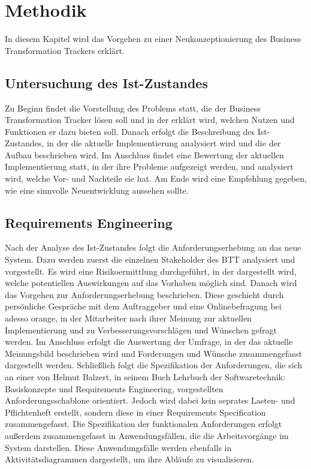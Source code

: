 \section{Methodik}
In diesem Kapitel wird das Vorgehen zu einer Neukonzeptionierung des Business Transformation Trackers erklärt.

\subsection{Untersuchung des Ist-Zustandes}
Zu Beginn findet die Vorstellung des Problems statt, die der Business Transformation Tracker lösen soll und in der erklärt wird, welchen Nutzen und Funktionen er dazu bieten soll. Danach erfolgt die Beschreibung des Ist-Zustandes, in der die aktuelle Implementierung analysiert wird und die der Aufbau beschrieben wird. Im Anschluss findet eine Bewertung der aktuellen Implementierung statt, in der ihre Probleme aufgezeigt werden, und analysiert wird, welche Vor- und Nachteile sie hat. Am Ende wird eine Empfehlung gegeben, wie eine sinnvolle Neuentwicklung aussehen sollte.

\subsection{Requirements Engineering}
Nach der Analyse des Ist-Zustandes folgt die Anforderungserhebung an das neue System. Dazu werden zuerst die einzelnen Stakeholder des BTT analysiert und vorgestellt. Es wird eine Risikoermittlung durchgeführt, in der dargestellt wird, welche potentiellen Auswirkungen auf das Vorhaben möglich sind. Danach wird das Vorgehen zur Anforderungserhebung beschrieben. Diese geschieht durch persönliche Gespräche mit dem Auftraggeber und eine Onlinebefragung bei adesso orange, in der Mitarbeiter nach ihrer Meinung zur aktuellen Implementierung und zu Verbesserungsvorschlägen und Wünschen gefragt werden. Im Anschluss erfolgt die Auswertung der Umfrage, in der das aktuelle Meinungsbild beschrieben wird und Forderungen und Wünsche zusammengefasst dargestellt werden. Schließlich folgt die Spezifikation der Anforderungen, die sich an einer von Helmut Balzert, in seinem Buch \glqq{}Lehrbuch der Softwaretechnik: Basiskonzepte und Requirements Engineering\grqq{}, vorgestellten Anforderungsschablone orientiert. Jedoch wird dabei kein seprates Lasten- und Pflichtenheft erstellt, sondern diese in einer \glqq{}Requirements Specification\grqq{} zusammengefasst. Die Spezifikation der funktionalen Anforderungen erfolgt außerdem zusammengefasst in Anwendungsfällen, die die Arbeitsvorgänge im System darstellen. Diese Anwendungsfälle werden ebenfalls in Aktivitätsdiagrammen dargestellt, um ihre Abläufe zu visualisieren. 


